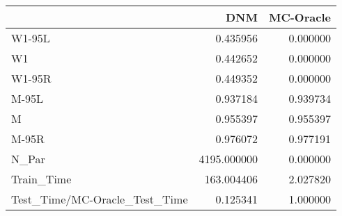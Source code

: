 \begin{tabular}{lrr}
\toprule
{} &          DNM &  MC-Oracle \\
\midrule
W1-95L                        &     0.435956 &   0.000000 \\
W1                            &     0.442652 &   0.000000 \\
W1-95R                        &     0.449352 &   0.000000 \\
M-95L                         &     0.937184 &   0.939734 \\
M                             &     0.955397 &   0.955397 \\
M-95R                         &     0.976072 &   0.977191 \\
N\_Par                         &  4195.000000 &   0.000000 \\
Train\_Time                    &   163.004406 &   2.027820 \\
Test\_Time/MC-Oracle\_Test\_Time &     0.125341 &   1.000000 \\
\bottomrule
\end{tabular}
